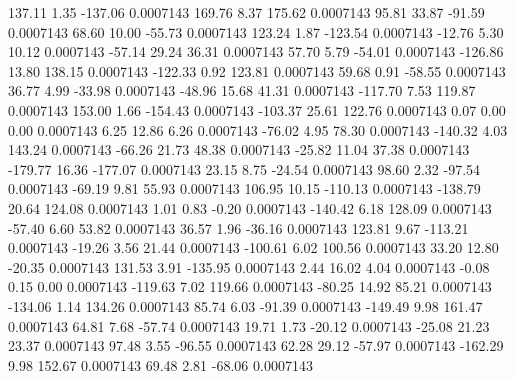       137.11        1.35     -137.06     0.0007143
      169.76        8.37      175.62     0.0007143
       95.81       33.87      -91.59     0.0007143
       68.60       10.00      -55.73     0.0007143
      123.24        1.87     -123.54     0.0007143
      -12.76        5.30       10.12     0.0007143
      -57.14       29.24       36.31     0.0007143
       57.70        5.79      -54.01     0.0007143
     -126.86       13.80      138.15     0.0007143
     -122.33        0.92      123.81     0.0007143
       59.68        0.91      -58.55     0.0007143
       36.77        4.99      -33.98     0.0007143
      -48.96       15.68       41.31     0.0007143
     -117.70        7.53      119.87     0.0007143
      153.00        1.66     -154.43     0.0007143
     -103.37       25.61      122.76     0.0007143
        0.07        0.00        0.00     0.0007143
        6.25       12.86        6.26     0.0007143
      -76.02        4.95       78.30     0.0007143
     -140.32        4.03      143.24     0.0007143
      -66.26       21.73       48.38     0.0007143
      -25.82       11.04       37.38     0.0007143
     -179.77       16.36     -177.07     0.0007143
       23.15        8.75      -24.54     0.0007143
       98.60        2.32      -97.54     0.0007143
      -69.19        9.81       55.93     0.0007143
      106.95       10.15     -110.13     0.0007143
     -138.79       20.64      124.08     0.0007143
        1.01        0.83       -0.20     0.0007143
     -140.42        6.18      128.09     0.0007143
      -57.40        6.60       53.82     0.0007143
       36.57        1.96      -36.16     0.0007143
      123.81        9.67     -113.21     0.0007143
      -19.26        3.56       21.44     0.0007143
     -100.61        6.02      100.56     0.0007143
       33.20       12.80      -20.35     0.0007143
      131.53        3.91     -135.95     0.0007143
        2.44       16.02        4.04     0.0007143
       -0.08        0.15        0.00     0.0007143
     -119.63        7.02      119.66     0.0007143
      -80.25       14.92       85.21     0.0007143
     -134.06        1.14      134.26     0.0007143
       85.74        6.03      -91.39     0.0007143
     -149.49        9.98      161.47     0.0007143
       64.81        7.68      -57.74     0.0007143
       19.71        1.73      -20.12     0.0007143
      -25.08       21.23       23.37     0.0007143
       97.48        3.55      -96.55     0.0007143
       62.28       29.12      -57.97     0.0007143
     -162.29        9.98      152.67     0.0007143
       69.48        2.81      -68.06     0.0007143
